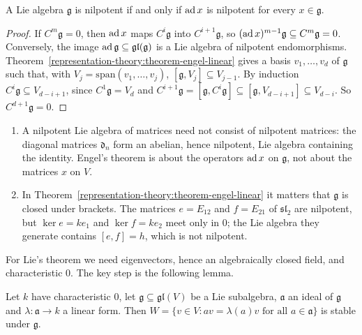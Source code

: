 \begin{corollary}\label{representation-theory:corollary-engel}
A Lie algebra $\mathfrak{g}$ is nilpotent if and only if $\operatorname{ad} x$ is nilpotent for every $x \in \mathfrak{g}$.
\end{corollary}

\begin{proof}
If $C^m\mathfrak{g} = 0$, then $\operatorname{ad} x$ maps $C^i\mathfrak{g}$ into $C^{i+1}\mathfrak{g}$, so $(\operatorname{ad} x)^{m-1}\mathfrak{g} \subseteq C^m\mathfrak{g} = 0$. Conversely, the image
$\operatorname{ad}\mathfrak{g} \subseteq \mathfrak{gl}(\mathfrak{g})$ is a Lie algebra of nilpotent endomorphisms. Theorem~\ref{representation-theory:theorem-engel-linear} gives a basis
$v_1, \ldots, v_d$ of $\mathfrak{g}$ such that, with $V_j = \mathrm{span}(v_1, \ldots, v_j)$, $[\mathfrak{g}, V_j] \subseteq V_{j-1}$. By induction
$C^i\mathfrak{g} \subseteq V_{d - i + 1}$, since $C^1\mathfrak{g} = V_d$ and $C^{i+1}\mathfrak{g} = [\mathfrak{g}, C^i\mathfrak{g}] \subseteq [\mathfrak{g}, V_{d-i+1}] \subseteq V_{d-i}$.
So $C^{d+1}\mathfrak{g} = 0$.
\end{proof}

\begin{counterexample}\label{representation-theory:counterexample-engel}
\begin{enumerate}
\item A nilpotent Lie algebra of matrices need not consist of nilpotent matrices: the diagonal matrices $\mathfrak{d}_n$ form an abelian, hence nilpotent, Lie algebra
containing the identity. Engel's theorem is about the operators $\operatorname{ad} x$ on $\mathfrak{g}$, not about the matrices $x$ on $V$.
\item In Theorem~\ref{representation-theory:theorem-engel-linear} it matters that $\mathfrak{g}$ is closed under brackets. The matrices $e = E_{12}$ and $f = E_{21}$ of
$\mathfrak{sl}_2$ are nilpotent, but $\ker e = ke_1$ and $\ker f = ke_2$ meet only in $0$; the Lie algebra they generate contains $[e, f] = h$, which is not nilpotent.
\end{enumerate}
\end{counterexample}

For Lie's theorem we need eigenvectors, hence an algebraically closed field, and characteristic $0$. The key step is the following lemma.

\begin{lemma}\label{representation-theory:lemma-invariance}
Let $k$ have characteristic $0$, let $\mathfrak{g} \subseteq \mathfrak{gl}(V)$ be a Lie subalgebra, $\mathfrak{a}$ an ideal of $\mathfrak{g}$ and
$\lambda \colon \mathfrak{a} \to k$ a linear form. Then $W = \{v \in V : av = \lambda(a)v \text{ for all } a \in \mathfrak{a}\}$ is stable under $\mathfrak{g}$.
\end{lemma}

